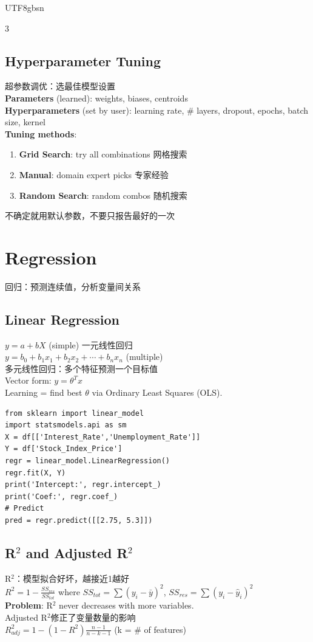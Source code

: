 \documentclass[9pt,landscape,a4paper]{article}
\newcommand{\zhint}[1]{{\scriptsize\color{gray!70!black}#1}}
\begin{document}
\begin{CJK}{UTF8}{gbsn}
\begin{multicols}{3}
\subsection{Hyperparameter Tuning}
\zhint{超参数调优：选最佳模型设置}\\
\textbf{Parameters} (learned): weights, biases, centroids\\
\textbf{Hyperparameters} (set by user): learning rate, \# layers, dropout, epochs, batch size, kernel\\[2pt]
\textbf{Tuning methods}:
\begin{enumerate}[leftmargin=10pt,itemsep=0pt,topsep=0pt]
\item \textbf{Grid Search}: try all combinations \zhint{网格搜索}
\item \textbf{Manual}: domain expert picks \zhint{专家经验}
\item \textbf{Random Search}: random combos \zhint{随机搜索}
\end{enumerate}
\zhint{不确定就用默认参数，不要只报告最好的一次}

\section{Regression}
\zhint{回归：预测连续值，分析变量间关系}

\subsection{Linear Regression}
$y = a + bX$ (simple) \zhint{一元线性回归}\\
$y = b_0 + b_1x_1 + b_2x_2 + \cdots + b_nx_n$ (multiple)\\
\zhint{多元线性回归：多个特征预测一个目标值}\\
Vector form: $y = \theta^T x$\\
Learning = find best $\theta$ via Ordinary Least Squares (OLS).

\begin{lstlisting}
from sklearn import linear_model
import statsmodels.api as sm
X = df[['Interest_Rate','Unemployment_Rate']]
Y = df['Stock_Index_Price']
regr = linear_model.LinearRegression()
regr.fit(X, Y)
print('Intercept:', regr.intercept_)
print('Coef:', regr.coef_)
# Predict
pred = regr.predict([[2.75, 5.3]])
\end{lstlisting}

\subsection{R$^2$ and Adjusted R$^2$}
\zhint{R$^2$：模型拟合好坏，越接近1越好}\\
$R^2 = 1 - \frac{SS_{res}}{SS_{tot}}$ where $SS_{tot}=\sum(y_i-\bar{y})^2$, $SS_{res}=\sum(y_i-\hat{y}_i)^2$\\[2pt]
\textbf{Problem}: R$^2$ never decreases with more variables.\\
\zhint{Adjusted R$^2$修正了变量数量的影响}\\
$R^2_{adj} = 1 - (1-R^2)\frac{n-1}{n-k-1}$ \quad (k = \# of features)


\end{multicols}
\end{CJK}
\end{document}

